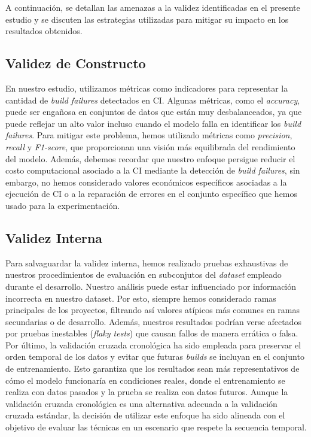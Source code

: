 A continuación, se detallan las amenazas a la validez identificadas en el presente estudio y se
discuten las estrategias utilizadas para mitigar su impacto en los resultados obtenidos.

\subsection{Validez de Constructo}
En nuestro estudio, utilizamos métricas como indicadores para representar la cantidad de
\textit{build failures} detectados en CI. Algunas métricas, como el \textit{accuracy}, puede ser
engañosa en conjuntos de datos que están muy desbalanceados, ya que puede reflejar un alto
valor incluso cuando el modelo falla en identificar los \textit{build failures}. Para mitigar
este problema, hemos utilizado métricas como \textit{precision}, \textit{recall} y \textit{F1-score},
que proporcionan una visión más equilibrada del rendimiento del modelo. Además, debemos
recordar que nuestro enfoque persigue reducir el costo computacional asociado a la CI mediante
la detección de \textit{build failures}, sin embargo, no hemos considerado valores 
económicos específicos asociadas a la ejecución de CI o a la reparación de errores en el conjunto
específico que hemos usado para la experimentación.


\subsection{Validez Interna}
Para salvaguardar la validez interna, hemos realizado pruebas exhaustivas de nuestros
procedimientos de evaluación en subconjutos del \textit{dataset} empleado durante el desarrollo.
Nuestro análisis puede estar influenciado por información incorrecta en nuestro dataset. Por
esto, siempre hemos considerado ramas principales de los proyectos, filtrando así
valores atípicos más comunes en ramas secundarias o de desarrollo. Además, nuestros resultados
podrían verse afectados por pruebas inestables (\textit{flaky tests}) que causan fallos
de manera errática o falsa.\\

Por último, la validación cruzada cronológica ha sido empleada para preservar el orden temporal
de los datos y evitar que futuras \textit{builds} se incluyan en el conjunto de entrenamiento. Esto
garantiza que los resultados sean más representativos de cómo el modelo funcionaría en
condiciones reales, donde el entrenamiento se realiza con datos pasados y la prueba se realiza
con datos futuros. Aunque la validación cruzada cronológica es una alternativa adecuada a la
validación cruzada estándar, la decisión de utilizar este enfoque ha sido alineada con el objetivo
de evaluar las técnicas en un escenario que respete la secuencia temporal.


